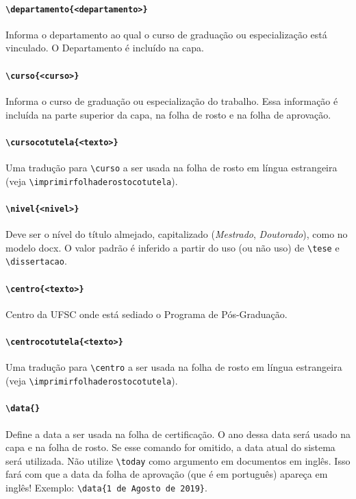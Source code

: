 \documentclass[embeddedlogo]{ufsc-thesis-rn46-2019}
\newcommand{\lacmd}[1]{\texttt{\textbackslash{}#1}}
\begin{document}
\paragraph*{\lacmd{departamento\{<departamento>\}}} Informa o departamento ao
qual o curso de graduação ou especialização está vinculado. O Departamento é
incluído na capa.

\paragraph*{\lacmd{curso\{<curso>\}}} Informa o curso de graduação
ou especialização do trabalho. Essa informação é incluída na parte superior da
capa, na folha de rosto e na folha de aprovação.

\paragraph*{\lacmd{cursocotutela\{<texto>\}}} Uma tradução para
\lacmd{curso} a ser usada na folha de rosto em língua estrangeira (veja
\lacmd{imprimirfolhaderostocotutela}).

\paragraph*{\lacmd{nivel\{<nivel>\}}} Deve ser o nível do título almejado,
capitalizado (\emph{Mestrado}, \emph{Doutorado}), como no modelo docx. O valor
padrão é inferido a partir do uso (ou não uso) de \lacmd{tese} e
\lacmd{dissertacao}.

\paragraph*{\lacmd{centro\{<texto>\}}} Centro da UFSC onde está sediado o
Programa de Pós-Graduação.

\paragraph*{\lacmd{centrocotutela\{<texto>\}}} Uma tradução para
\lacmd{centro} a ser usada na folha de rosto em língua estrangeira (veja
\lacmd{imprimirfolhaderostocotutela}).

\paragraph*{\lacmd{data\{<data por extenso>\}}} Define a data a ser usada na
folha de certificação. O ano dessa data será usado na capa e na folha de
rosto. Se esse comando for omitido, a data atual do sistema será utilizada. Não
utilize \lacmd{today} como argumento em documentos em inglês. Isso fará com que
a data da folha de aprovação (que é em português) apareça em inglês! Exemplo:
\lacmd{data\{1 de Agosto de 2019\}}.
\end{document}
